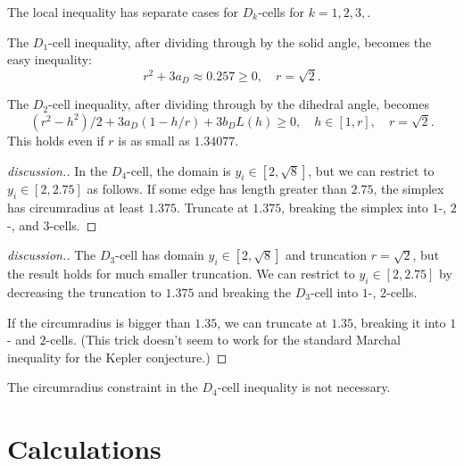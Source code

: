 \begin{calculation}
The local inequality  has separate cases for $D_k$-cells for
$k=1,2,3,$.
\end{calculation}

The $D_1$-cell inequality, after dividing through by the solid angle, becomes
the easy inequality:
\[
r^2 + 3 a_D \approx 0.257 \ge 0,\quad r = \sqrt2.
\]

The $D_2$-cell inequality, after dividing through by the dihedral angle, becomes
\[
 (r^2-h^2)/2 + 3 a_D (1-h/r)  + 3 b_D L(h) \ge 0, \quad h\in [1,r],\quad r = \sqrt2.
\]
This holds even if $r$ is as small as $1.34077$.

\begin{calculation}
\end{calculation}

\begin{proof}[discussion.]
In the $D_4$-cell, the domain is
$y_i\in[2,\sqrt8]$, but we can restrict to $y_i\in[2,2.75]$ as follows.
If some edge has length greater than $2.75$, the simplex has
circumradius at least $1.375$.  Truncate at $1.375$, breaking the
simplex into $1$-, $2$-, and $3$-cells.
\end{proof}

\begin{calculation}
\end{calculation}

\begin{proof}[discussion.]
The $D_3$-cell  has domain $y_i\in[2,\sqrt8]$ and
truncation $r=\sqrt2$, but the result holds for much smaller
truncation.  We can restrict to $y_i\in [2,2.75]$ by decreasing the
truncation to $1.375$ and breaking the $D_3$-cell into $1$-, $2$-cells.

If the circumradius is bigger than $1.35$, we can truncate at $1.35$, breaking
it into $1$- and $2$-cells.  (This trick doesn't seem to work for the standard Marchal
inequality for the Kepler conjecture.)
\end{proof}


The circumradius constraint in the $D_4$-cell inequality is not necessary.



\chapter{Calculations}





